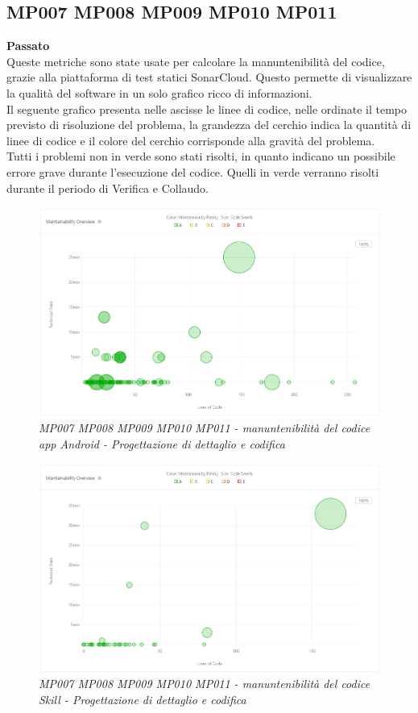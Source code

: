 \subsection{MP007 MP008 MP009 MP010 MP011 }
\textbf{Passato}\\
Queste metriche sono state usate per calcolare la manuntenibilità del codice, grazie alla piattaforma di test statici SonarCloud. Questo permette di visualizzare la qualità del software in un solo grafico ricco di informazioni.\\
Il seguente grafico presenta nelle ascisse le linee di codice, nelle ordinate il tempo previsto di risoluzione del problema, la grandezza del cerchio indica la quantità di linee di codice e il colore del cerchio corrisponde alla gravità del problema.\\
Tutti i problemi non in verde sono stati risolti, in quanto indicano un possibile errore grave durante l'esecuzione del codice. Quelli in verde verranno risolti durante il periodo di Verifica e Collaudo.\\
\begin{figure} [H]
    \centering
	\includegraphics[scale=0.5]{./images/manPDC.png}
    \caption{\textit{MP007 MP008 MP009 MP010 MP011 - manuntenibilità del codice app Android - Progettazione di dettaglio e codifica}}\label{}
\end{figure}
\begin{figure} [H]
    \centering
	\includegraphics[scale=0.5]{./images/manSPDC.png}
    \caption{\textit{MP007 MP008 MP009 MP010 MP011 - manuntenibilità del codice Skill - Progettazione di dettaglio e codifica}}\label{}
\end{figure}

